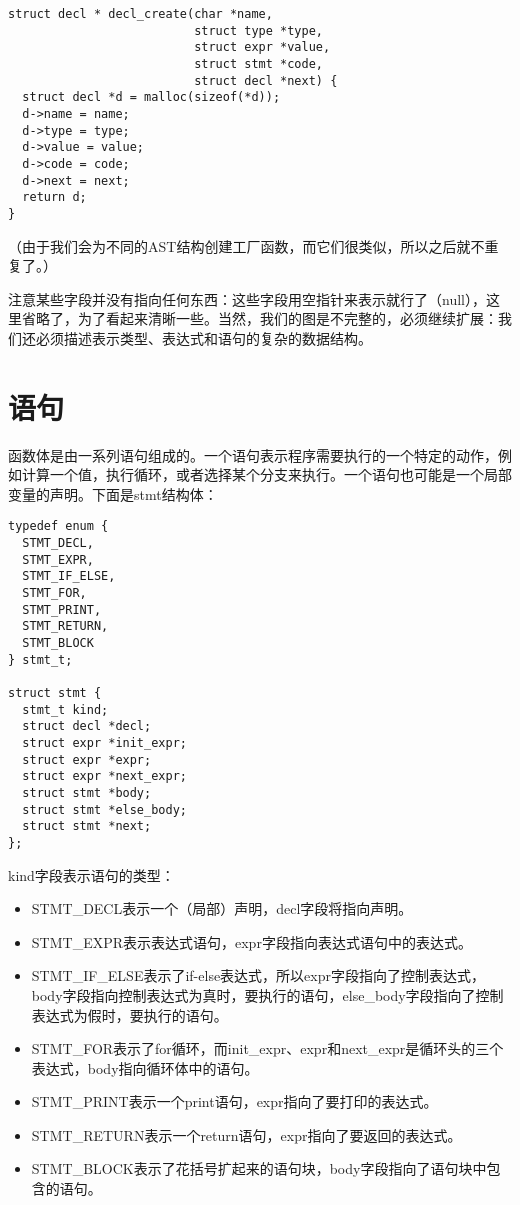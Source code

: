 \documentclass[cn,11pt,chinese]{elegantbook}
\begin{document}
\begin{verbatim}
struct decl * decl_create(char *name,
                          struct type *type,
                          struct expr *value,
                          struct stmt *code,
                          struct decl *next) {
  struct decl *d = malloc(sizeof(*d));
  d->name = name;
  d->type = type;
  d->value = value;
  d->code = code;
  d->next = next;
  return d;
}
\end{verbatim}

（由于我们会为不同的AST结构创建工厂函数，而它们很类似，所以之后就不重复了。）

注意某些字段并没有指向任何东西：这些字段用空指针来表示就行了（null），这里省略了，为了看起来清晰一些。当然，我们的图是不完整的，必须继续扩展：我们还必须描述表示类型、表达式和语句的复杂的数据结构。

\section{语句}

函数体是由一系列语句组成的。一个语句表示程序需要执行的一个特定的动作，例如计算一个值，执行循环，或者选择某个分支来执行。一个语句也可能是一个局部变量的声明。下面是stmt结构体：

\begin{verbatim}
typedef enum {
  STMT_DECL,
  STMT_EXPR,
  STMT_IF_ELSE,
  STMT_FOR,
  STMT_PRINT,
  STMT_RETURN,
  STMT_BLOCK
} stmt_t;

struct stmt {
  stmt_t kind;
  struct decl *decl;
  struct expr *init_expr;
  struct expr *expr;
  struct expr *next_expr;
  struct stmt *body;
  struct stmt *else_body;
  struct stmt *next;
};
\end{verbatim}

kind字段表示语句的类型：

\begin{itemize}
  \item STMT\_DECL表示一个（局部）声明，decl字段将指向声明。
  \item STMT\_EXPR表示表达式语句，expr字段指向表达式语句中的表达式。
  \item STMT\_IF\_ELSE表示了if-else表达式，所以expr字段指向了控制表达式，body字段指向控制表达式为真时，要执行的语句，else\_body字段指向了控制表达式为假时，要执行的语句。
  \item STMT\_FOR表示了for循环，而init\_expr、expr和next\_expr是循环头的三个表达式，body指向循环体中的语句。
  \item STMT\_PRINT表示一个print语句，expr指向了要打印的表达式。
  \item STMT\_RETURN表示一个return语句，expr指向了要返回的表达式。
  \item STMT\_BLOCK表示了花括号扩起来的语句块，body字段指向了语句块中包含的语句。
\end{itemize}
\end{document}
